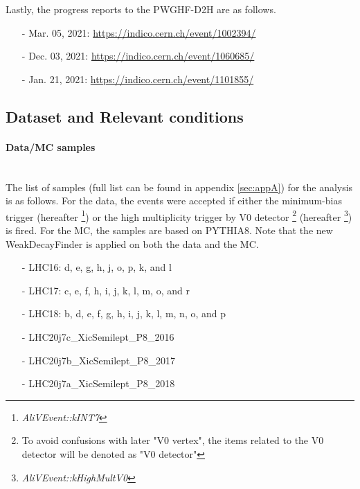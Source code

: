 Lastly, the progress reports to the PWGHF-D2H are as follows.
%
\begin{itemize}
    \small
    \item[]  \vspace{1pt}
    \item[-] Mar. 05, 2021: \url{https://indico.cern.ch/event/1002394/}
    \item[-] Dec. 03, 2021: \url{https://indico.cern.ch/event/1060685/}
    \item[-] Jan. 21, 2021: \url{https://indico.cern.ch/event/1101855/}
\end{itemize}

\clearpage

\subsection{Dataset and Relevant conditions}\label{subsec:dataset}

\vspace{\columnsep}
\paragraph{Data/MC samples}\mbox{}\\
The list of samples (full list can be found in appendix \ref{sec:appA}) for the analysis is as follows. For the  \TeV data, the events were accepted if either the minimum-bias trigger (hereafter  \footnote{\textit{AliVEvent::kINT7}}) or the high multiplicity trigger by V0 detector \footnote{To avoid confusions with later "V0 vertex", the items related to the V0 detector will be denoted as "V0 detector"} (hereafter  \footnote{\textit{AliVEvent::kHighMultV0}}) is fired. For the MC, the samples are based on PYTHIA8. Note that the new WeakDecayFinder \cite{JiraTicket} is applied on both the data and the MC.
%
\begin{itemize}
    \small
    \item[]  \vspace{1pt}
    \item[-] LHC16: d, e, g, h, j, o, p, k, and l
    \item[-] LHC17: c, e, f, h, i, j, k, l, m, o, and r
    \item[-] LHC18: b, d, e, f, g, h, i, j, k, l, m, n, o, and p
    \vspace{\columnsep}
    \item[]  \vspace{1pt}
    \item[-] LHC20j7c\_XicSemilept\_P8\_2016
    \item[-] LHC20j7b\_XicSemilept\_P8\_2017
    \item[-] LHC20j7a\_XicSemilept\_P8\_2018
\end{itemize}

